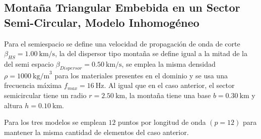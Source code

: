 \documentclass[spanish,letterpaper,12pt,twoside,openany]{article}
\begin{document}
\subsection{Montaña Triangular Embebida en un Sector Semi-Circular, Modelo Inhomogéneo}
%
Para el semiespacio se define una velocidad de propagación de onda de corte $\beta_{HS} = 1.00\ \text{km/s}$, la del dispersor tipo montaña se define igual a la mitad de la del semi espacio $\beta_{Dispersor} = 0.50\ \text{km/s}$, se emplea la misma densidad $\rho = 1000\ \text{kg/m}^3$ para los materiales presentes en el dominio y se usa una frecuencia máxima $f_{max} =  16\ \text{Hz}$. Al igual que en el caso anterior, el sector semicircular tiene un radio $r=2.50\ \text{km}$, la montaña tiene una base $b=0.30\ \text{km}$ y altura $h=0.10\ \text{km}$.

Para los tres modelos se emplean $12$ puntos por longitud de onda $\left( p = 12 \right)$ para mantener la misma cantidad de elementos del caso anterior.
\end{document}
